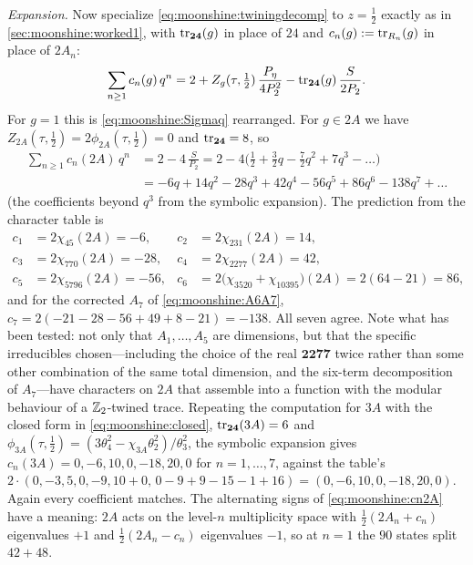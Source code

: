 \emph{Expansion.} Now specialize \eqref{eq:moonshine:twiningdecomp} to $z=\tfrac12$ exactly
as in \cref{sec:moonshine:worked1}, with $\operatorname{tr}_{\mathbf{24}}(g)$ in place of $24$ and
$c_n(g):=\operatorname{tr}_{R_n}(g)$ in place of $2A_n$:
\begin{equation}\label{eq:moonshine:cn}
  \sum_{n\ge1}c_n(g)\,q^n=2+Z_g(\tau,\tfrac12)\,\frac{P_\eta}{4P_2^2}
  -\operatorname{tr}_{\mathbf{24}}(g)\,\frac{S}{2P_2}.
\end{equation}
For $g=1$ this is \eqref{eq:moonshine:Sigmaq} rearranged. For $g\in2A$ we have
$Z_{2A}(\tau,\tfrac12)=2\phi_{2A}(\tau,\tfrac12)=0$ and $\operatorname{tr}_{\mathbf{24}}=8$, so
\begin{equation}\label{eq:moonshine:cn2A}
\begin{aligned}
  \sum_{n\ge1}c_n(2A)\,q^n&=2-4\,\frac{S}{P_2}
  =2-4\bigl(\tfrac12+\tfrac32q-\tfrac72q^2+7q^3-\dots\bigr)\\
  &=-6q+14q^2-28q^3+42q^4-56q^5+86q^6-138q^7+\dots
\end{aligned}
\end{equation}
(the coefficients beyond $q^3$ from the symbolic expansion). The prediction from the
character table is
\begin{align*}
 c_1&=2\chi_{45}(2A)=-6,& c_2&=2\chi_{231}(2A)=14,\\
 c_3&=2\chi_{770}(2A)=-28,& c_4&=2\chi_{2277}(2A)=42,\\
 c_5&=2\chi_{5796}(2A)=-56,&
 c_6&=2\bigl(\chi_{3520}+\chi_{10395}\bigr)(2A)=2(64-21)=86,
\end{align*}
and for the corrected $A_7$ of \eqref{eq:moonshine:A6A7},
$c_7=2(-21-28-56+49+8-21)=-138$. All seven agree. Note what has been tested: not only
that $A_1,\dots,A_5$ are dimensions, but that the specific irreducibles chosen---including the
choice of the real $\mathbf{2277}$ twice rather than some other combination of the same
total dimension, and the six-term decomposition of $A_7$---have characters on $2A$ that
assemble into a function with the modular behaviour of a $\mathbb{Z}_2$-twined trace. Repeating the
computation for $3A$ with the closed form in \eqref{eq:moonshine:closed}, $\operatorname{tr}_{\mathbf{24}}(3A)=6$
and $\phi_{3A}(\tau,\tfrac12)=(3\theta_4^2-\chi_{3A}\theta_2^2)/\theta_3^2$, the symbolic
expansion gives $c_n(3A)=0,-6,10,0,-18,20,0$ for $n=1,\dots,7$, against the table's
$2\cdot(0,-3,5,0,-9,10+0,\,0-9+9-15-1+16)=(0,-6,10,0,-18,20,0)$. Again every coefficient
matches. The alternating signs of \eqref{eq:moonshine:cn2A} have a meaning: $2A$ acts on
the level-$n$ multiplicity space with $\tfrac12(2A_n+c_n)$ eigenvalues $+1$ and
$\tfrac12(2A_n-c_n)$ eigenvalues $-1$, so at $n=1$ the $90$ states split $42+48$.

